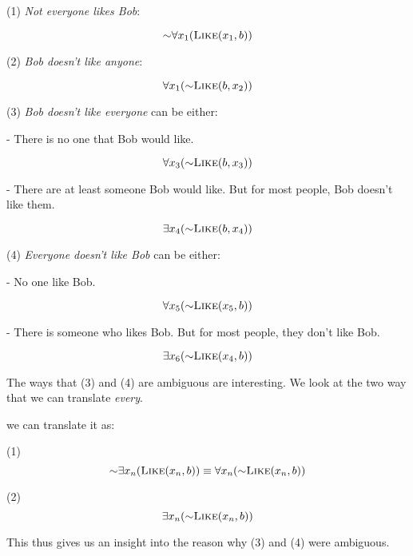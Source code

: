 \documentclass{article}
\begin{document}
(1) \textit{Not everyone likes Bob}:

$$ \mathord{\sim} \forall x_1 (\textsc{Like}(x_1, b))$$

(2) \textit{Bob doesn't like anyone}:

$$ \forall x_1 (\mathord{\sim} \textsc{Like}(b, x_2)) $$

(3) \textit{Bob doesn’t like everyone} can be either:

- There is no one that Bob would like. 

$$ \forall x_3 (\mathord{\sim} \textsc{Like}(b, x_3)) $$


- There are at least someone Bob would like. But for most people, Bob doesn't like them.

$$ \exists x_4 (\mathord{\sim} \textsc{Like}(b, x_4)) $$

(4) \textit{Everyone doesn't like Bob} can be either:

- No one like Bob.

$$ \forall x_5 (\mathord{\sim} \textsc{Like}(x_5, b))$$

- There is someone who likes Bob. But for most people, they don't like Bob.

$$ \exists x_6 (\mathord{\sim} \textsc{Like}(x_4, b)) $$

The ways that (3) and (4) are ambiguous are interesting. We look at the two way that we can translate \textit{every}. 

we can translate it as:

(1) $$\mathord{\sim} \exists x_n (\textsc{Like}(x_n, b)) \equiv \forall x_n (\mathord{\sim} \textsc{Like}(x_n, b)) $$

(2) $$\exists x_n (\mathord{\sim} \textsc{Like}(x_n, b)) $$

This thus gives us an insight into the reason why (3) and (4) were ambiguous.
\end{document}
